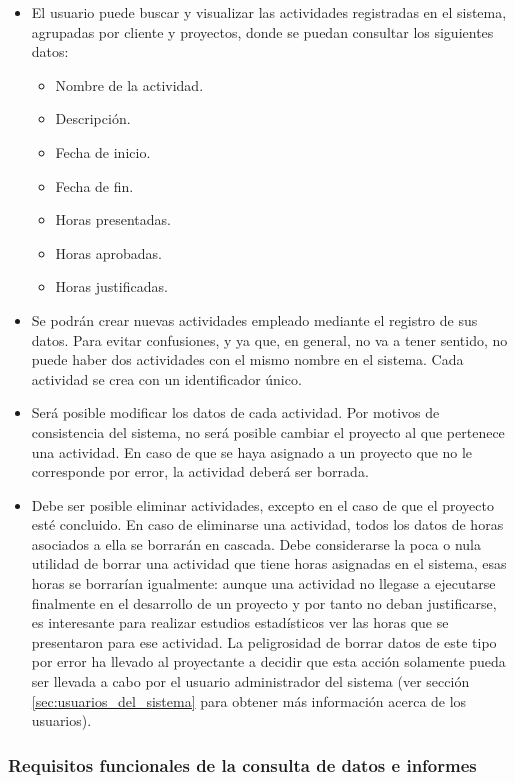 \begin{itemize}
\item El usuario puede buscar y visualizar las actividades registradas en
el sistema, agrupadas por cliente y proyectos, donde se puedan consultar los
siguientes datos:
  \begin{itemize}
  \item Nombre de la actividad.
  \item Descripción.
  \item Fecha de inicio.
  \item Fecha de fin.
  \item Horas presentadas.
  \item Horas aprobadas.
  \item Horas justificadas.
  \end{itemize}
 
\item Se podrán crear nuevas actividades empleado mediante el registro de
sus datos. Para evitar confusiones, y ya que, en general, no va a tener sentido,
no puede haber dos actividades con el mismo nombre en el sistema. Cada actividad
se crea con un identificador único.

\item Será posible modificar los datos de cada actividad. Por motivos de
consistencia del sistema, no será posible cambiar el proyecto al que pertenece
una actividad. En caso de que se haya asignado a un proyecto que no le
corresponde por error, la actividad deberá ser borrada.

\item Debe ser posible eliminar actividades, excepto en el caso de que el
proyecto esté concluido. En caso de
eliminarse una actividad, todos los datos de horas asociados a ella se borrarán
en cascada. Debe considerarse la poca o nula utilidad de borrar una actividad
que tiene horas asignadas en el sistema, esas horas se borrarían igualmente:
aunque una actividad no llegase a ejecutarse finalmente en el
desarrollo de un proyecto y por tanto no deban justificarse, es
interesante para realizar estudios estadísticos ver las horas que se presentaron
para ese actividad. La peligrosidad de borrar datos de este tipo por error ha
llevado al proyectante a decidir que esta acción solamente pueda ser llevada a
cabo por el usuario administrador del sistema (ver sección
\ref{sec:usuarios_del_sistema} para obtener más información acerca de los
usuarios).
\end{itemize}

\subsubsection{Requisitos funcionales de la consulta de datos e informes}
\label{sec:requisitos_informes}

